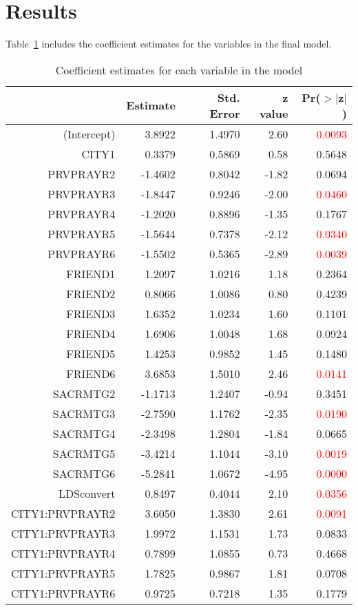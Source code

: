 \documentclass[11pt]{article}
\begin{document}
\section*{Results}
Table~\ref{results} includes the coefficient estimates for the variables in the final model. 
\begin{table}[ht] 
\centering
\begin{tabular}{rrrrr} 
  \hline
 & Estimate & Std. Error & z value & Pr($>$$|$z$|$) \\ 
  \hline \vspace{1mm}
(Intercept) & 3.8922 & 1.4970 & 2.60 & \textcolor{red}{0.0093} \\ \vspace{1mm}
  CITY1 & 0.3379 & 0.5869 & 0.58 & 0.5648 \\ 
  PRVPRAYR2 & -1.4602 & 0.8042 & -1.82 & 0.0694 \\ 
  PRVPRAYR3 & -1.8447 & 0.9246 & -2.00 & \textcolor{red}{0.0460} \\ 
  PRVPRAYR4 & -1.2020 & 0.8896 & -1.35 & 0.1767 \\ 
  PRVPRAYR5 & -1.5644 & 0.7378 & -2.12 & \textcolor{red}{0.0340} \\ \vspace{1mm}
  PRVPRAYR6 & -1.5502 & 0.5365 & -2.89 & \textcolor{red}{0.0039} \\ 
  FRIEND1 & 1.2097 & 1.0216 & 1.18 & 0.2364 \\ 
  FRIEND2 & 0.8066 & 1.0086 & 0.80 & 0.4239 \\ 
  FRIEND3 & 1.6352 & 1.0234 & 1.60 & 0.1101 \\ 
  FRIEND4 & 1.6906 & 1.0048 & 1.68 & 0.0924 \\ 
  FRIEND5 & 1.4253 & 0.9852 & 1.45 & 0.1480 \\ \vspace{1mm}
  FRIEND6 & 3.6853 & 1.5010 & 2.46 & \textcolor{red}{0.0141} \\ 
  SACRMTG2 & -1.1713 & 1.2407 & -0.94 & 0.3451 \\ 
  SACRMTG3 & -2.7590 & 1.1762 & -2.35 & \textcolor{red}{0.0190} \\ 
  SACRMTG4 & -2.3498 & 1.2804 & -1.84 & 0.0665 \\ 
  SACRMTG5 & -3.4214 & 1.1044 & -3.10 & \textcolor{red}{0.0019} \\ \vspace{1mm}
  SACRMTG6 & -5.2841 & 1.0672 & -4.95 & \textcolor{red}{0.0000} \\ \vspace{1mm}
  LDSconvert & 0.8497 & 0.4044 & 2.10 & \textcolor{red}{0.0356} \\ 
  CITY1:PRVPRAYR2 & 3.6050 & 1.3830 & 2.61 & \textcolor{red}{0.0091} \\ 
  CITY1:PRVPRAYR3 & 1.9972 & 1.1531 & 1.73 & 0.0833 \\ 
  CITY1:PRVPRAYR4 & 0.7899 & 1.0855 & 0.73 & 0.4668 \\ 
  CITY1:PRVPRAYR5 & 1.7825 & 0.9867 & 1.81 & 0.0708 \\ 
  CITY1:PRVPRAYR6 & 0.9725 & 0.7218 & 1.35 & 0.1779 \\ 
   \hline
\end{tabular}
\caption{Coefficient estimates for each variable in the model}
\label{results}
\end{table}
\end{document}
